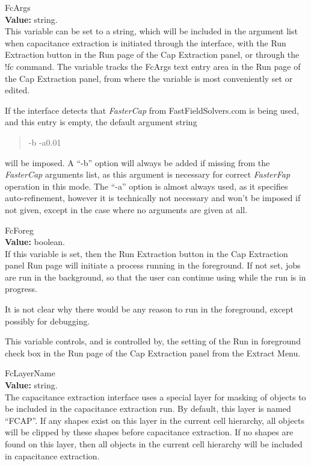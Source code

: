 \begin{description}
\item{\et FcArgs}\\
{\bf Value:} string.\\
This variable can be set to a string, which will be included in the
argument list when capacitance extraction is initiated through the
interface, with the {\cb Run Extraction} button in the {\cb Run} page
of the {\cb Cap Extraction} panel, or through the {\cb !fc} command. 
The variable tracks the {\cb FcArgs} text entry area in the {\cb Run}
page of the {\cb Cap Extraction} panel, from where the variable is
most conveniently set or edited.

If the interface detects that {\it FasterCap} from {\vt
FastFieldSolvers.com} is being used, and this entry is empty, the
default argument string
\begin{quote} \vt
-b -a0.01
\end{quote}
will be imposed.  A ``{\vt -b}'' option will always be added if
missing from the {\it FasterCap} arguments list, as this argument is
necessary for correct {\it FasterFap} operation in this mode.  The
``{\vt -a}'' option is almost always used, as it specifies
auto-refinement, however it is technically not necessary and won't be
imposed if not given, except in the case where no arguments are given
at all.

\item{\et FcForeg}\\
{\bf Value:} boolean.\\
If this variable is set, then the {\cb Run Extraction} button in the
{\cb Cap Extraction} panel {\cb Run} page will initiate a process
running in the foreground.  If not set, jobs are run in the
background, so that the user can continue using {\Xic} while the run
is in progress.

It is not clear why there would be any reason to run in the
foreground, except possibly for debugging.

This variable controls, and is controlled by, the setting of the {\cb
Run in foreground} check box in the {\cb Run} page of the {\cb Cap
Extraction} panel from the {\cb Extract Menu}.

\item{\et FcLayerName}\\
{\bf Value:} string.\\
The capacitance extraction interface uses a special layer for masking
of objects to be included in the capacitance extraction run.  By
default, this layer is named ``{\vt FCAP}''.  If any shapes exist on
this layer in the current cell hierarchy, all objects will be clipped
by these shapes before capacitance extraction.  If no shapes are found
on this layer, then all objects in the current cell hierarchy will be
included in capacitance extraction.


\end{description}
